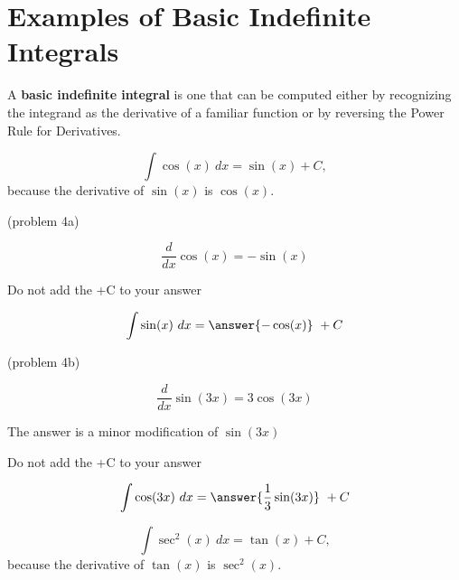 \documentclass[handout]{ximera}
\begin{document}
\section{Examples of Basic Indefinite Integrals}

A \textbf{basic indefinite integral} is one that can be computed either by recognizing the integrand as the 
derivative of a familiar function or by reversing the Power Rule for Derivatives.



\begin{example}[example 4]
\[
\int \cos(x) \ dx = \sin(x) + C,
\]
because the derivative of $\sin(x)$ is $\cos(x)$.

\end{example}

\begin{problem}(problem 4a)

\begin{hint}
\[
\frac{d}{dx} \cos(x) = -\sin(x)
\]
\end{hint}
\begin{hint}
\begin{center}
Do not add the +C to your answer
\end{center}
\end{hint}

\[
\int \sin(x) \ dx =
\answer{-\cos(x)} \ + C
\]
\end{problem}

\begin{problem}(problem 4b)

\begin{hint}
\[
\frac{d}{dx} \sin(3x) = 3\cos(3x)
\]
\end{hint}
\begin{hint}
The answer is a minor modification of $\sin(3x)$
\end{hint}
\begin{hint}
\begin{center}
Do not add the +C to your answer
\end{center}
\end{hint}

\[
\int \cos(3x) \ dx =
\answer{\frac13 \sin(3x)} \ + C
\]
\end{problem}

\begin{example}[example 5]
\[
\int \sec^2(x) \ dx = \tan(x) + C,
\]
because the derivative of $\tan(x)$ is $\sec^2(x)$.

\end{example}
\end{document}
